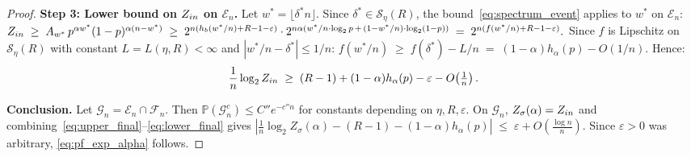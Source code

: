 \documentclass[10pt,a4paper]{amsart}
\newcommand{\Hb}{h_b}
\newcommand{\Pb}{\mathbb{P}}
\newcommand{\Seta}{\mathcal{S}}
\begin{document}
\begin{proof}
 
\noindent\textbf{Step 3: Lower bound on $Z_{\rm in}$ on $\mathcal{E}_n$.}
Let $w^*=\lfloor\delta^* n\rfloor$.
Since $\delta^*\in\Seta_\eta(R)$, the bound~\eqref{eq:spectrum_event}
applies to $w^*$ on $\mathcal{E}_n$:
\(
    Z_{\rm in}
    \;\ge\;
    A_{w^*}\,p^{\alpha w^*}(1-p)^{\alpha(n-w^*)}
    \;\ge\;
    2^{n(\Hb(w^*/n)+R-1-\varepsilon)}\cdot
    2^{n\alpha(w^*/n\cdot\log_2 p\,+\,(1-w^*/n)\cdot\log_2(1-p))}
    \;=\;
    2^{n(f(w^*/n)+R-1-\varepsilon)}.
\)
Since $f$ is Lipschitz on $\Seta_\eta(R)$ with constant
$L=L(\eta,R)<\infty$ and $|w^*/n-\delta^*|\le 1/n$:
\(
    f(w^*/n)\;\ge\; f(\delta^*)-L/n
    \;=\;(1-\alpha)h_\alpha(p)-O(1/n).
\)
Hence:
\begin{equation}
    \frac{1}{n}\log_2 Z_{\rm in}
    \;\ge\;
    (R-1)+(1-\alpha)h_\alpha(p)-\varepsilon-O\!\left(\tfrac{1}{n}\right).
    \label{eq:lower_final}
\end{equation}

 
\noindent\textbf{Conclusion.}
Let $\mathcal{G}_n=\mathcal{E}_n\cap\mathcal{F}_n$.
Then $\Pb(\mathcal{G}_n^c)\le C''e^{-c''n}$ for constants
depending on $\eta,R,\varepsilon$.
On $\mathcal{G}_n$, $Z_\sigma(\alpha)=Z_{\rm in}$ and
combining~\eqref{eq:upper_final}--\eqref{eq:lower_final} gives
\(
    \left|
    \frac{1}{n}\log_2 Z_\sigma(\alpha)
    -(R-1)-(1-\alpha)h_\alpha(p)
    \right|
    \;\le\;
    \varepsilon+O\!\left(\tfrac{\log n}{n}\right).
\)
Since $\varepsilon>0$ was arbitrary, \eqref{eq:pf_exp_alpha} follows.
\end{proof}
\end{document}
